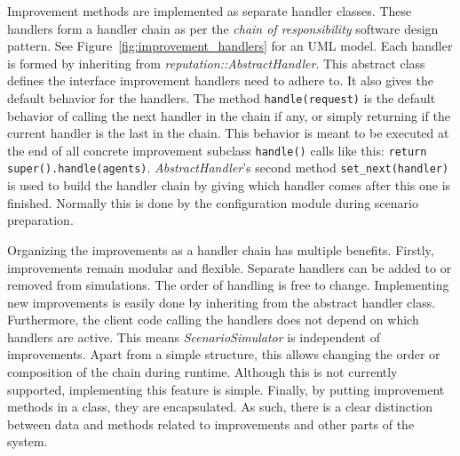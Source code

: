 \documentclass[%
    ]{\PathToTumTemplate/thesis/tum_thesis}
\begin{document}
Improvement methods are implemented as separate handler classes.
These handlers form a handler chain as per the \emph{chain of responsibility} software design pattern.
See Figure~\ref{fig:improvement_handlers} for an UML model.
Each handler is formed by inheriting from \emph{reputation::AbstractHandler}.
This abstract class defines the interface improvement handlers need to adhere to.
It also gives the default behavior for the handlers.
The method \texttt{handle(request)} is the default behavior of calling the next handler in the chain if any, or simply returning if the current handler is the last in the chain.
This behavior is meant to be executed at the end of all concrete improvement subclass \texttt{handle()} calls like this: \lstinline{return super().handle(agents)}.
\emph{AbstractHandler}'s second method \texttt{set\_next(handler)} is used to build the handler chain by giving which handler comes after this one is finished.
Normally this is done by the configuration module during scenario preparation.

Organizing the improvements as a handler chain has multiple benefits.
Firstly, improvements remain modular and flexible.
Separate handlers can be added to or removed from simulations.
The order of handling is free to change.
Implementing new improvements is easily done by inheriting from the abstract handler class.
Furthermore, the client code calling the handlers does not depend on which handlers are active.
This means \emph{ScenarioSimulator} is independent of improvements.
Apart from a simple structure, this allows changing the order or composition of the chain during runtime.
Although this is not currently supported, implementing this feature is simple.
Finally, by putting improvement methods in a class, they are encapsulated.
As such, there is a clear distinction between data and methods related to improvements and other parts of the system.
\end{document}
